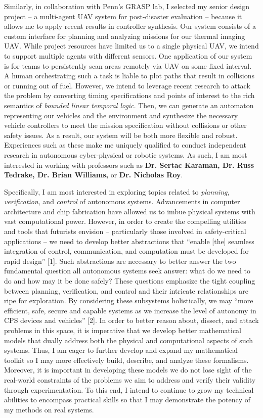 \documentclass[]{letter}
\begin{document}
Similarly, in collaboration with Penn's GRASP lab, I selected my senior design project -- a multi-agent UAV system for post-disaster evaluation -- because it allows me to apply recent results in controller synthesis. Our system consists of a custom interface for planning and analyzing missions for our thermal imaging UAV. While project resources have limited us to a single physical UAV, we intend to support multiple agents with different sensors. One application of our system is for teams to persistently scan areas remotely via UAV on some fixed interval. A human orchestrating such a task is liable to plot paths that result in collisions or running out of fuel. However, we intend to leverage recent research to attack the problem by converting timing specifications and points of interest to the rich semantics of \emph{bounded linear temporal logic}. Then, we can generate an automaton representing our vehicles and the environment and synthesize the necessary vehicle controllers to meet the mission specification without collisions or other safety issues. As a result, our system will be both more flexible and robust. Experiences such as these make me uniquely qualified to conduct independent research in autonomous cyber-physical or robotic systems. As such, I am most interested in working with professors such as {\bf{Dr. Sertac Karaman, Dr. Russ Tedrake, Dr. Brian Williams,}} or {\bfseries{Dr. Nicholas Roy}}.

Specifically, I am most interested in exploring topics related to \emph{planning, verification}, and \emph{control} of autonomous systems. Advancements in computer architecture and chip fabrication have allowed us to imbue physical systems with vast computational power. However, in order to create the compelling utilities and tools that futurists envision -- particularly those involved in safety-critical applications -- we need to develop better abstractions that ``enable [the] seamless integration of control, communication, and computation must be developed for rapid design'' [1]. Such abstractions are necessary to better answer the two fundamental question all autonomous systems seek answer: what do we need to do and how may it be done safely? These questions emphasize the tight coupling between planning, verification, and control and their intricate relationships are ripe for exploration. By considering these subsystems holistically, we may ``more efficient, safe, secure and capable systems as we increase the level of autonomy in CPS devices and vehicles'' [2]. In order to better reason about, dissect, and attack problems in this space, it is imperative that we develop better mathematical models that dually address both the physical and computational aspects of such systems. Thus, I am eager to further develop and expand my mathematical toolkit so I may more effectively build, describe, and analyze these formalisms. Moreover, it is important in developing these models we do not lose sight of the real-world constraints of the problems we aim to address and verify their validity through experimentation. To this end, I intend to continue to grow my technical abilities to encompass practical skills so that I may demonstrate the potency of my methods on real systems.
\end{document}
